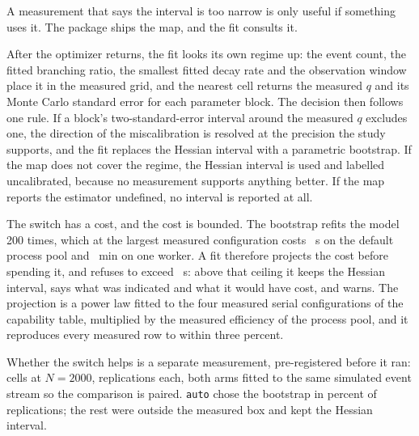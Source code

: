 A measurement that says the interval is too narrow is only useful if something
uses it. The package ships the map, and the fit consults it.

After the optimizer returns, the fit looks its own regime up: the event count, the
fitted branching ratio, the smallest fitted decay rate and the observation window
place it in the measured grid, and the nearest cell returns the measured $q$ and
its Monte Carlo standard error for each parameter block. The decision then follows
one rule. If a block's two-standard-error interval around the measured $q$ excludes
one, the direction of the miscalibration is resolved at the precision the study
supports, and the fit replaces the Hessian interval with a parametric bootstrap. If
the map does not cover the regime, the Hessian interval is used and labelled
uncalibrated, because no measurement supports anything better. If the map reports
the estimator undefined, no interval is reported at all.

The switch has a cost, and the cost is bounded. The bootstrap refits the model 200
times, which at the largest measured configuration costs \AutoPoolCost{}~s on the
default process pool and \AutoSerialCostMin{}~min on one worker. A fit therefore
projects the cost before spending it, and refuses to exceed \AutoLimit{}~s: above
that ceiling it keeps the Hessian interval, says what was indicated and what it
would have cost, and warns. The projection is a power law fitted to the four
measured serial configurations of the capability table, multiplied by the measured
efficiency of the process pool, and it reproduces every measured row to within
three percent.

Whether the switch helps is a separate measurement, pre-registered before it ran:
\AutoCells{} cells at $N = 2000$, \AutoReplications{} replications each, both arms
fitted to the same simulated event stream so the comparison is paired.
\texttt{auto} chose the bootstrap in \AutoBootstrapShare{} percent of replications;
the rest were outside the measured box and kept the Hessian interval.

\begin{table}[t]
\centering
\caption{Coverage of nominal-95\% intervals under the Hessian interval and under
\texttt{auto}, with the paired difference $\delta = |\text{cov}_{\text{auto}} -
0.95| - |\text{cov}_{\text{hessian}} - 0.95|$. Negative $\delta$ means
\texttt{auto} is closer to nominal.}

\end{table}

